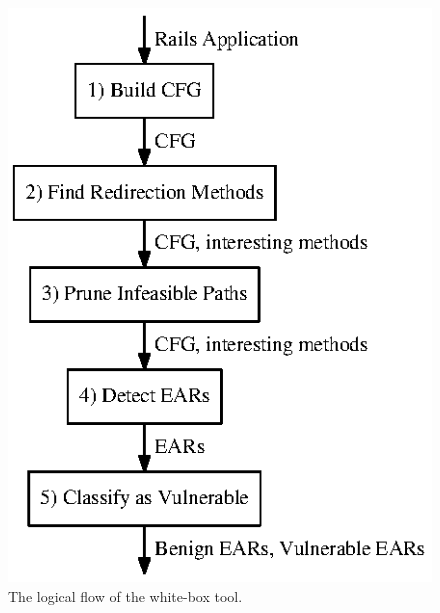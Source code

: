 \begin{figure}[tb]
  \centering
  \includegraphics{figures/white_box_diagram_raw.ps}
  \caption{The logical flow of the white-box tool.}
  \vspace{3ex}
\end{figure}
